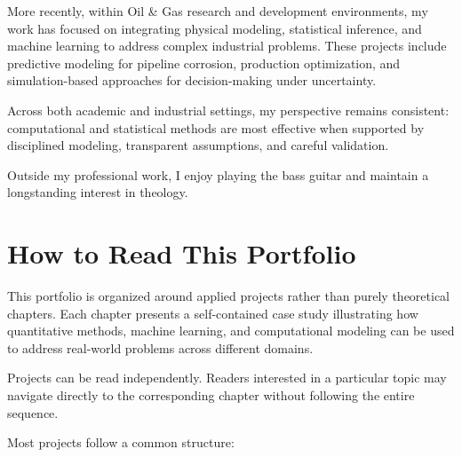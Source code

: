\documentclass[
  12pt,
  letterpaper,
]{book}
\begin{document}
More recently, within Oil \& Gas research and development environments,
my work has focused on integrating physical modeling, statistical
inference, and machine learning to address complex industrial problems.
These projects include predictive modeling for pipeline corrosion,
production optimization, and simulation-based approaches for
decision-making under uncertainty.

Across both academic and industrial settings, my perspective remains
consistent: computational and statistical methods are most effective
when supported by disciplined modeling, transparent assumptions, and
careful validation.

Outside my professional work, I enjoy playing the bass guitar and
maintain a longstanding interest in theology.


\chapter*{How to Read This Portfolio}\label{how-to-read-this-portfolio}


This portfolio is organized around applied projects rather than purely
theoretical chapters. Each chapter presents a self-contained case study
illustrating how quantitative methods, machine learning, and
computational modeling can be used to address real-world problems across
different domains.

Projects can be read independently. Readers interested in a particular
topic may navigate directly to the corresponding chapter without
following the entire sequence.

Most projects follow a common structure:
\end{document}
